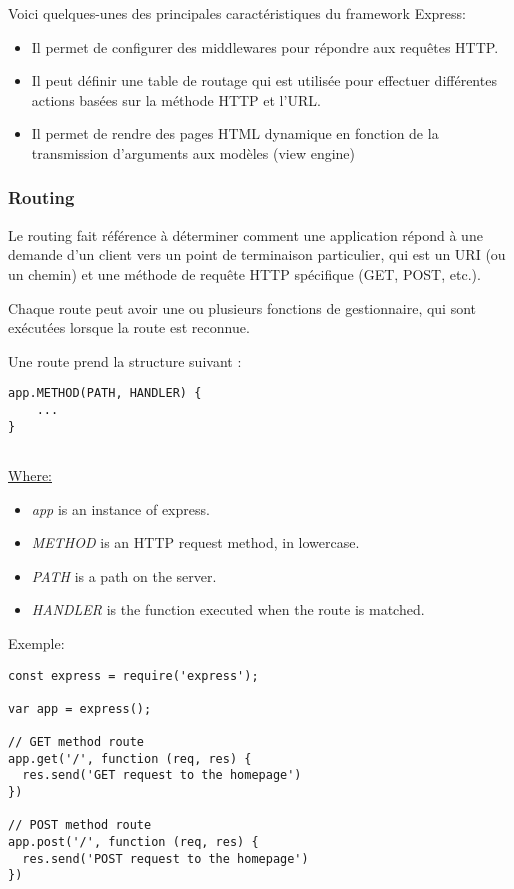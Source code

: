 \documentclass[a4paper,10pt]{article}
\begin{document}
Voici quelques-unes des principales caractéristiques du framework Express: 
\begin{itemize}
    \item Il permet de configurer des middlewares pour répondre aux requêtes HTTP.
    \item Il peut définir une table de routage qui est utilisée pour effectuer différentes actions basées sur la méthode HTTP et l'URL.
    \item Il permet de rendre des pages HTML dynamique en fonction de la transmission d'arguments aux modèles (view engine)
\end{itemize}

\subsubsection{Routing}
Le routing fait référence à déterminer comment une application répond à une demande d'un client vers un point de terminaison particulier, qui est un URI (ou un chemin) et une méthode de requête HTTP spécifique (GET, POST, etc.).

Chaque route peut avoir une ou plusieurs fonctions de gestionnaire, qui sont exécutées lorsque la route est reconnue.

Une route prend la structure  suivant : 

\begin{lstlisting}[frame=single]
app.METHOD(PATH, HANDLER) {
    ...
}
    
\end{lstlisting}

\underline{Where:}
\begin{itemize}
    \item \emph{app} is an instance of express.
    \item \emph{METHOD} is an HTTP request method, in lowercase.
    \item \emph{PATH} is a path on the server.
    \item\emph{HANDLER} is the function executed when the route is matched.
\end{itemize}
Exemple:
\begin{lstlisting}[frame=single]
const express = require('express');

var app = express();

// GET method route
app.get('/', function (req, res) {
  res.send('GET request to the homepage')
})

// POST method route
app.post('/', function (req, res) {
  res.send('POST request to the homepage')
})
\end{lstlisting}
\end{document}
